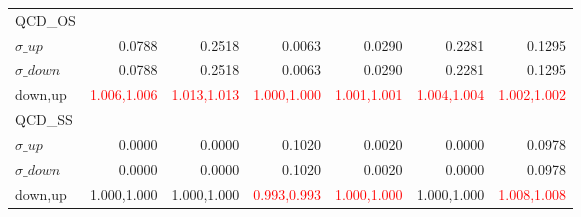 \documentclass[11pt,oneside,a4paper]{article}
\begin{document}
\begin{table}
\begin{tabular}{lrrrrrr}
\hline
QCD\_OS &  &  &  &  &  &  \\
$\sigma\_up$ & 0.0788 & 0.2518 & 0.0063 & 0.0290 & 0.2281 & 0.1295 \\
$\sigma\_down$ & 0.0788 & 0.2518 & 0.0063 & 0.0290 & 0.2281 & 0.1295 \\
down,up & \textcolor{red}{1.006,1.006} & \textcolor{red}{1.013,1.013} & \textcolor{red}{1.000,1.000} & \textcolor{red}{1.001,1.001} & \textcolor{red}{1.004,1.004} & \textcolor{red}{1.002,1.002} \\

\hline
QCD\_SS &  &  &  &  &  &  \\
$\sigma\_up$ & 0.0000 & 0.0000 & 0.1020 & 0.0020 & 0.0000 & 0.0978 \\
$\sigma\_down$ & 0.0000 & 0.0000 & 0.1020 & 0.0020 & 0.0000 & 0.0978 \\
down,up & 1.000,1.000 & 1.000,1.000 & \textcolor{red}{0.993,0.993} & \textcolor{red}{1.000,1.000} & 1.000,1.000 & \textcolor{red}{1.008,1.008} \\

\hline
\end{tabular}
\end{table}
\end{document}

